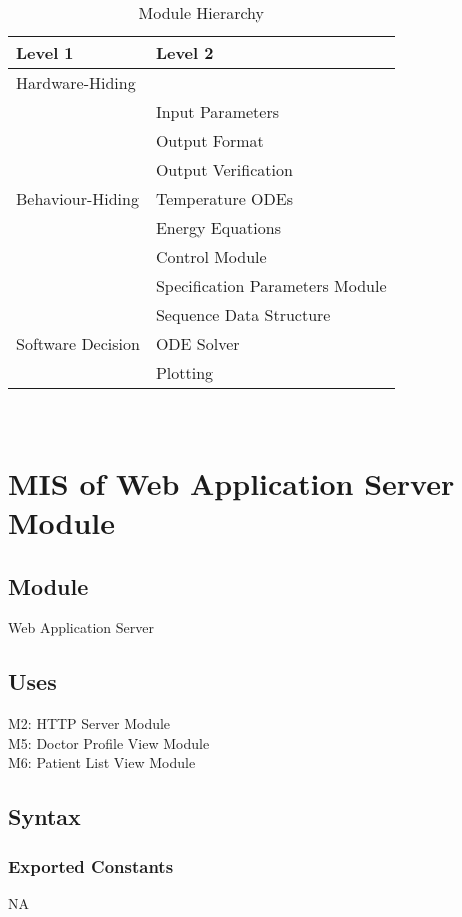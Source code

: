 \documentclass[12pt, titlepage]{article}
\begin{document}
\begin{table}[h!]
\centering
\begin{tabular}{p{} p{}}
\toprule
\textbf{Level 1} & \textbf{Level 2}\\
\midrule

{Hardware-Hiding} & ~ \\
\midrule

\multirow{7}{0.3\textwidth}{Behaviour-Hiding} & Input Parameters\\
& Output Format\\
& Output Verification\\
& Temperature ODEs\\
& Energy Equations\\ 
& Control Module\\
& Specification Parameters Module\\
\midrule

\multirow{3}{0.3\textwidth}{Software Decision} & {Sequence Data Structure}\\
& ODE Solver\\
& Plotting\\
\bottomrule

\end{tabular}
\caption{Module Hierarchy}
\label{TblMH}
\end{table}

\newpage
~\newpage

\section{MIS of Web Application Server Module} 

\subsection{Module}
Web Application Server   
\subsection{Uses}
M2: HTTP Server Module \\ 
M5: Doctor Profile View Module \\ 
M6: Patient List View Module \\ 
\subsection{Syntax}
\subsubsection{Exported Constants}
NA
\end{document}
